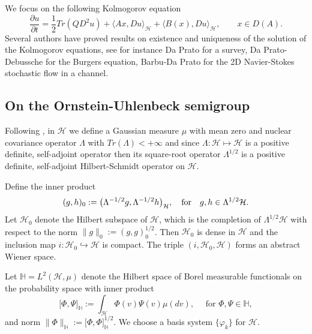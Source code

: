 \documentclass[review, onefignum, onetabnum]{siamart171218}
\begin{document}
    We focus on the following Kolmogorov equation  
\begin{equation}
    \label{P1s2.3}
    \frac{\partial u}{\partial t}= \frac{1}{2}Tr(QD^2u)+ \langle Ax, Du 
    \rangle_\mathcal{H} + \langle B(x),Du \rangle_\mathcal{H},\qquad x\in D(A).
\end{equation}
    Several authors have proved results on existence and uniqueness of the 
solution of the Kolmogorov equations, see for instance Da Prato \cite{da} for a 
survey, Da Prato-Debussche \cite{da-de} for the Burgers equation,  Barbu-Da 
Prato \cite{ba-da} for the 2D Navier-Stokes stochastic flow in a channel.
%
\subsection{On the Ornstein-Uhlenbeck semigroup}\label{OUS-sect}
    Following \cite{liu},  in $\mathcal{H}$ we define a Gaussian measure $\mu$ 
with mean zero and nuclear covariance operator $\Lambda$ with 
${Tr(\Lambda)<+\infty}$ and since $\Lambda:\mathcal{H}\mapsto \mathcal{H}$ is a 
positive definite, self-adjoint operator then its square-root operator 
$\Lambda^{1/2}$ is a positive definite, self-adjoint Hilbert-Schmidt operator 
on $\mathcal{H}$.

    Define the inner product 
\[
    ( g, h )_0 := \big( \Lambda^{-1/2}g ,  \Lambda^{-1/2} h \big)_\mathcal{H}, 
    \quad \hbox{\rm for}\quad g,h\in \Lambda^{1/2} \mathcal{H}.
\]
Let $\mathcal{H}_0$ denote the Hilbert subspace of $\mathcal{H}$, which is the 
completion of $\Lambda^{1/2} \mathcal{H}$ with 
respect to the norm $\|g\|_0:= ( g, g )_0^{1/2} $. Then ${\mathcal{H}_0}$ is 
dense in $\mathcal{H}$ and the inclusion map    
$i:\mathcal{H}_0\hookrightarrow\mathcal{H}$ is compact. The triple 
$(i,\mathcal{H}_0,\mathcal{H})$ forms an abstract Wiener space. 

    Let 
$
    \mathbb{H} = L^2 (\mathcal{H}, \mu)
$
denote the Hilbert space of Borel 
measurable functionals on the probability space with inner 
product 
\[
    \big [ \Phi,\Psi\big ]_\mathbb{H}:=\int_{\mathcal{H}} \Phi(v) 
    \Psi(v)\mu(dv),\quad
    \text{ for } \Phi,\Psi\in\mathbb{H}, 
\]
and norm $\|\Phi\|_{\mathbb{H}}:=\big [\Phi,\Phi\big ]_\mathbb{H}^{1/2}$. 
We choose a basis system $\{\varphi_k\}$ for $\mathcal{H}$.
\end{document}
